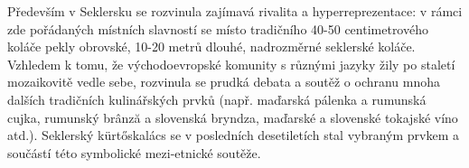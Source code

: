 Především v Seklersku se rozvinula zajímavá rivalita a
hyperreprezentace: v rámci zde pořádaných místních slavností se místo
tradičního 40-50 centimetrového koláče pekly obrovské, 10-20 metrů
dlouhé, nadrozměrné seklerské koláče. Vzhledem k tomu, že
východoevropské komunity s různými jazyky žily po staletí mozaikovitě
vedle sebe, rozvinula se prudká debata a soutěž o ochranu mnoha dalších
tradičních kulinářských prvků (např. maďarská pálenka a rumunská cujka,
rumunský brânză a slovenská bryndza, maďarské a slovenské tokajské víno
atd.). Seklerský kürtőskalács se v posledních desetiletích stal vybraným
prvkem a součástí této symbolické mezi-etnické soutěže.
